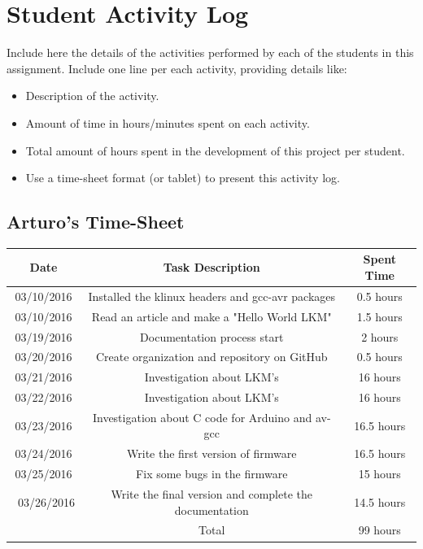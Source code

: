 \documentclass[12pt]{article}
\begin{document}
\section{Student Activity Log}
Include here the details of the activities performed by each of the students in this assignment.
Include one line per each activity, providing details like:
\begin{itemize}
\item Description of the activity.
\item Amount of time in hours/minutes spent on each activity.
\item Total amount of hours spent in the development of this project per student.
\item Use a time-sheet format (or tablet) to present this activity log.
\end{itemize}
\subsection{Arturo's Time-Sheet}
\begin{center}
\begin{tabular}{ |c|c|c| } 
 \hline
 Date & Task Description & Spent Time \\ 
 \hline\hline
  03/10/2016 & Installed the klinux headers and gcc-avr packages & 0.5 hours\\
 03/10/2016 & Read an article and make a "Hello World LKM" & 1.5 hours\\ 
  03/19/2016  & Documentation process start & 2 hours\\ 
   03/20/2016  & Create organization and repository on GitHub & 0.5 hours\\
   03/21/2016 &Investigation about LKM's&16 hours \\
   03/22/2016 &Investigation about LKM's&16 hours \\
   03/23/2016 &Investigation about C code for Arduino and av-gcc&16.5 hours \\
   03/24/2016 &Write the first version of firmware&16.5 hours\\
   03/25/2016 &Fix some bugs in the firmware&15 hours \\\
   03/26/2016 &Write the final version and complete the documentation&14.5 hours \\
 \hline
 & Total & 99 hours\\ 
 \hline
\end{tabular}
\end{center}
\end{document}
